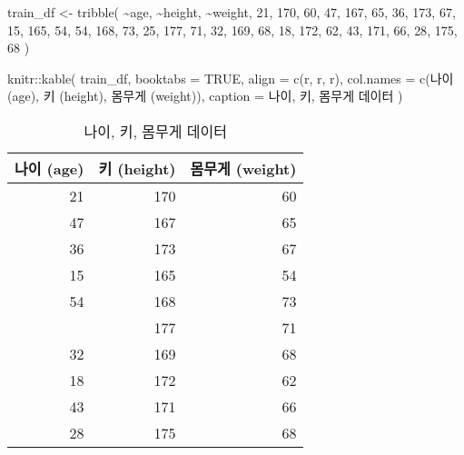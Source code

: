 \documentclass[
]{book}
\newenvironment{Shaded}{\begin{snugshade}}{\end{snugshade}}
\newcommand{\AttributeTok}[1]{\textcolor[rgb]{0.77,0.63,0.00}{#1}}
\newcommand{\ConstantTok}[1]{\textcolor[rgb]{0.00,0.00,0.00}{#1}}
\newcommand{\DecValTok}[1]{\textcolor[rgb]{0.00,0.00,0.81}{#1}}
\newcommand{\FunctionTok}[1]{\textcolor[rgb]{0.00,0.00,0.00}{#1}}
\newcommand{\NormalTok}[1]{#1}
\newcommand{\OtherTok}[1]{\textcolor[rgb]{0.56,0.35,0.01}{#1}}
\newcommand{\SpecialCharTok}[1]{\textcolor[rgb]{0.00,0.00,0.00}{#1}}
\newcommand{\StringTok}[1]{\textcolor[rgb]{0.31,0.60,0.02}{#1}}
\begin{document}
\begin{Shaded}
\begin{Highlighting}[]
\NormalTok{train\_df }\OtherTok{\textless{}{-}} \FunctionTok{tribble}\NormalTok{(}
  \SpecialCharTok{\textasciitilde{}}\NormalTok{age, }\SpecialCharTok{\textasciitilde{}}\NormalTok{height, }\SpecialCharTok{\textasciitilde{}}\NormalTok{weight,}
  \DecValTok{21}\NormalTok{, }\DecValTok{170}\NormalTok{, }\DecValTok{60}\NormalTok{,}
  \DecValTok{47}\NormalTok{, }\DecValTok{167}\NormalTok{, }\DecValTok{65}\NormalTok{,}
  \DecValTok{36}\NormalTok{, }\DecValTok{173}\NormalTok{, }\DecValTok{67}\NormalTok{,}
  \DecValTok{15}\NormalTok{, }\DecValTok{165}\NormalTok{, }\DecValTok{54}\NormalTok{,}
  \DecValTok{54}\NormalTok{, }\DecValTok{168}\NormalTok{, }\DecValTok{73}\NormalTok{,}
  \DecValTok{25}\NormalTok{, }\DecValTok{177}\NormalTok{, }\DecValTok{71}\NormalTok{,}
  \DecValTok{32}\NormalTok{, }\DecValTok{169}\NormalTok{, }\DecValTok{68}\NormalTok{,}
  \DecValTok{18}\NormalTok{, }\DecValTok{172}\NormalTok{, }\DecValTok{62}\NormalTok{,}
  \DecValTok{43}\NormalTok{, }\DecValTok{171}\NormalTok{, }\DecValTok{66}\NormalTok{,}
  \DecValTok{28}\NormalTok{, }\DecValTok{175}\NormalTok{, }\DecValTok{68}
\NormalTok{)}

\NormalTok{knitr}\SpecialCharTok{::}\FunctionTok{kable}\NormalTok{(}
\NormalTok{  train\_df, }\AttributeTok{booktabs =} \ConstantTok{TRUE}\NormalTok{,}
  \AttributeTok{align =} \FunctionTok{c}\NormalTok{(}\StringTok{\textquotesingle{}r\textquotesingle{}}\NormalTok{, }\StringTok{\textquotesingle{}r\textquotesingle{}}\NormalTok{, }\StringTok{\textquotesingle{}r\textquotesingle{}}\NormalTok{),}
  \AttributeTok{col.names =} \FunctionTok{c}\NormalTok{(}\StringTok{\textquotesingle{}나이 (age)\textquotesingle{}}\NormalTok{, }\StringTok{\textquotesingle{}키 (height)\textquotesingle{}}\NormalTok{, }\StringTok{\textquotesingle{}몸무게 (weight)\textquotesingle{}}\NormalTok{),}
  \AttributeTok{caption =} \StringTok{\textquotesingle{}나이, 키, 몸무게 데이터\textquotesingle{}}
\NormalTok{)}
\end{Highlighting}
\end{Shaded}

\begin{table}

\caption{\label{tab:regression-age-height-weight-data}나이, 키, 몸무게 데이터}
\centering
\begin{tabular}[t]{rrr}
\toprule
나이 (age) & 키 (height) & 몸무게 (weight)\\
\midrule
21 & 170 & 60\\
47 & 167 & 65\\
36 & 173 & 67\\
15 & 165 & 54\\
54 & 168 & 73\\
\addlinespace
25 & 177 & 71\\
32 & 169 & 68\\
18 & 172 & 62\\
43 & 171 & 66\\
28 & 175 & 68\\
\bottomrule
\end{tabular}
\end{table}
\end{document}

